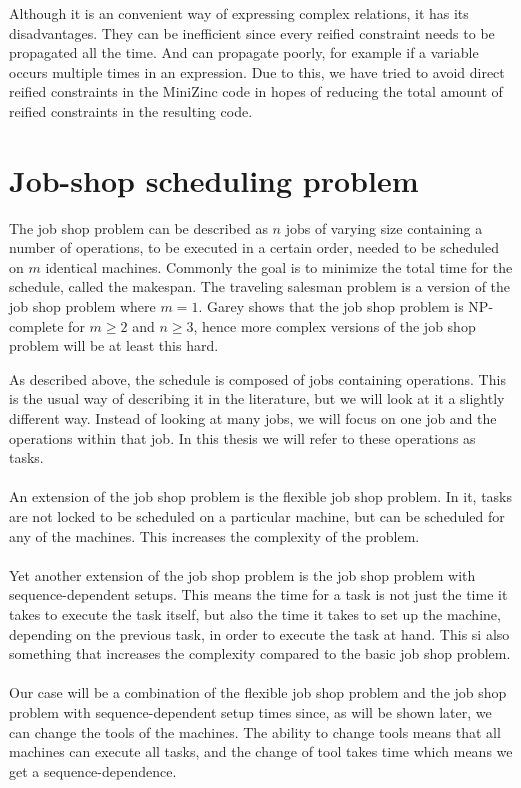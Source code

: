 Although it is an convenient way of expressing complex relations, it has its disadvantages. They can be inefficient since every reified constraint needs to be propagated all the time. And can propagate poorly, for example if a variable occurs multiple times in an expression.\cite{jefferson_2010} Due to this, we have tried to avoid direct reified constraints in the MiniZinc code in hopes of reducing the total amount of reified constraints in the resulting code.

\section{Job-shop scheduling problem}
The job shop problem can be described as $n$ jobs of varying size containing a number of operations, to be executed in a certain order, needed to be scheduled on $m$ identical machines. Commonly the goal is to minimize the total time for the schedule, called the makespan. The traveling salesman problem is a version of the job shop problem where $m = 1$. Garey shows that the job shop problem is NP-complete for $m \geq 2$ and $n \geq 3$\cite{garey_1976}, hence more complex versions of the job shop problem will be at least this hard.

As described above, the schedule is composed of jobs containing operations. This is the usual way of describing it in the literature, but we will look at it a slightly different way. Instead of looking at many jobs, we will focus on one job and the operations within that job. In this thesis we will refer to these operations as tasks.
\\\\
An extension of the job shop problem is the flexible job shop problem. In it, tasks are not locked to be scheduled on a particular machine, but can be scheduled for any of the machines.\cite{thornblad_2013} This increases the complexity of the problem.
\\\\
Yet another extension of the job shop problem is the job shop problem with sequence-dependent setups. This means the time for a task is not just the time it takes to execute the task itself, but also the time it takes to set up the machine, depending on the previous task, in order to execute the task at hand. This si also something that increases the complexity compared to the basic job shop problem.
\\\\
Our case will be a combination of the flexible job shop problem and the job shop problem with sequence-dependent setup times since, as will be shown later, we can change the tools of the machines. The ability to change tools means that all machines can execute all tasks, and the change of tool takes time which means we get a sequence-dependence.

